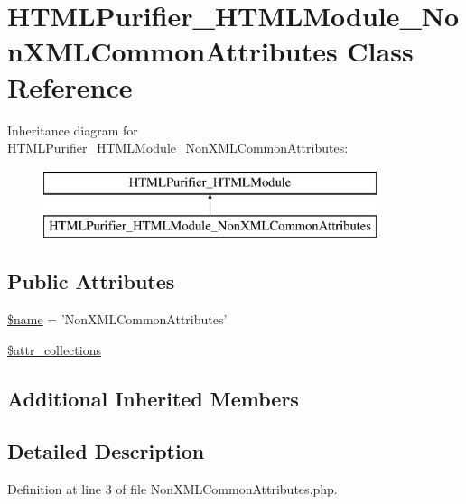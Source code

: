 \hypertarget{classHTMLPurifier__HTMLModule__NonXMLCommonAttributes}{\section{H\+T\+M\+L\+Purifier\+\_\+\+H\+T\+M\+L\+Module\+\_\+\+Non\+X\+M\+L\+Common\+Attributes Class Reference}
\label{classHTMLPurifier__HTMLModule__NonXMLCommonAttributes}
}
Inheritance diagram for H\+T\+M\+L\+Purifier\+\_\+\+H\+T\+M\+L\+Module\+\_\+\+Non\+X\+M\+L\+Common\+Attributes\+:\begin{figure}[H]
\begin{center}
\leavevmode
\includegraphics[height=2.000000cm]{classHTMLPurifier__HTMLModule__NonXMLCommonAttributes}
\end{center}
\end{figure}
\subsection*{Public Attributes}
\begin{DoxyCompactItemize}
\item 
\hyperlink{classHTMLPurifier__HTMLModule__NonXMLCommonAttributes_abad2282b74aaa25f94d0c3f7fb0c61a7}{\$name} = 'Non\+X\+M\+L\+Common\+Attributes'
\item 
\hyperlink{classHTMLPurifier__HTMLModule__NonXMLCommonAttributes_a1b6278c5b511e70b75d317bac85dbb22}{\$attr\+\_\+collections}
\end{DoxyCompactItemize}
\subsection*{Additional Inherited Members}


\subsection{Detailed Description}


Definition at line 3 of file Non\+X\+M\+L\+Common\+Attributes.\+php.



